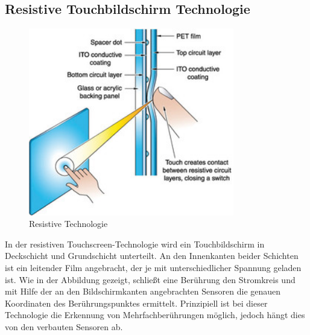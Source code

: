 \documentclass[12pt,oneside,a4paper,bibtotoc,liststotoc]{scrreprt}
\begin{document}
\subsection{Resistive Touchbildschirm Technologie}
\begin{figure}[H]
  \begin{centering}
    \includegraphics[width=0.8\textwidth]{img/Resistiv.png}
    \caption{Resistive Technologie \cite[vgl. Resistiv-4-5-7-und-8-Draht]{002}}
    \label{Resistiv}
  \end{centering}
\end{figure}
In der resistiven Touchscreen-Technologie wird ein Touchbildschirm in Deckschicht und Grundschicht unterteilt. An den Innenkanten beider Schichten ist ein leitender Film angebracht, der je mit unterschiedlicher Spannung geladen ist. Wie in der Abbildung gezeigt, schließt eine Berührung den Stromkreis und mit Hilfe der an den Bildschirmkanten angebrachten Sensoren die genauen Koordinaten des Berührungspunktes ermittelt. Prinzipiell ist bei dieser Technologie die Erkennung von Mehrfachberührungen möglich, jedoch hängt dies von den verbauten Sensoren ab.
\end{document}

